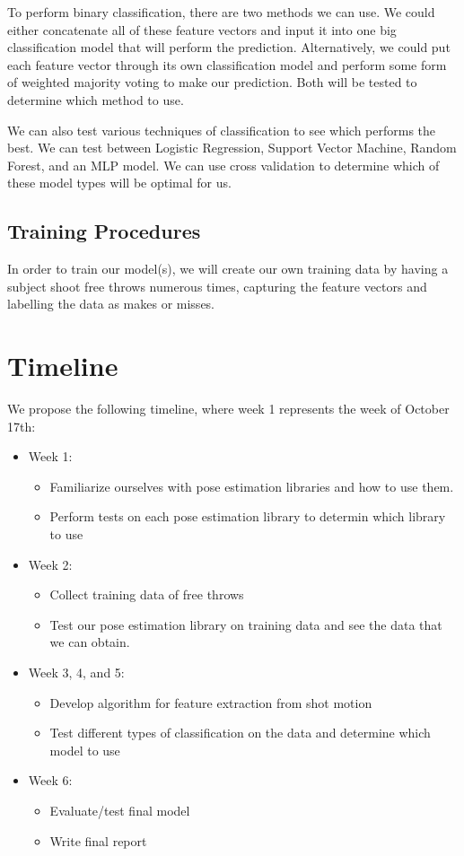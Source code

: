 \documentclass[10pt,twocolumn,letterpaper]{article}
\begin{document}
To perform binary classification, there are two methods we can use. We could either concatenate all of these feature vectors and input it into one big classification model that will perform the prediction. Alternatively, 
we could put each feature vector through its own classification model and perform some form of weighted majority voting to make our prediction. Both will be tested to determine which method to use.

We can also test various techniques of classification to see which performs the best. We can test between Logistic Regression, Support Vector Machine, Random Forest, and an MLP model. We can use cross validation to determine which
of these model types will be optimal for us.

\subsection{Training Procedures}
In order to train our model(s), we will create our own training data by having a subject shoot free throws numerous times, capturing the feature vectors and labelling the data as makes or misses.

\section{Timeline}
We propose the following timeline, where week 1 represents the week of October 17th:
\begin{itemize}
  \item Week 1: \begin{itemize}
    \item Familiarize ourselves with pose estimation libraries and how to use them.
    \item Perform tests on each pose estimation library to determin which library to use
  \end{itemize}
  \item Week 2: \begin{itemize}
    \item Collect training data of free throws
    \item Test our pose estimation library on training data and see the data that we can obtain.
  \end{itemize}
  \item Week 3, 4, and 5: \begin{itemize}
    \item Develop algorithm for feature extraction from shot motion
    \item Test different types of classification on the data and determine which model to use
  \end{itemize}
  \item Week 6: \begin{itemize}
    \item Evaluate/test final model
    \item Write final report
  \end{itemize}
\end{itemize}

{\small


}
\end{document}
